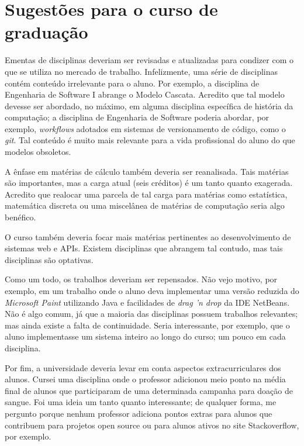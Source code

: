 

\section{Sugestões para o curso de graduação}

Ementas de disciplinas deveriam ser revisadas e atualizadas para
condizer com o que se utiliza no mercado de trabalho.
Infelizmente, uma série de disciplinas contém conteúdo
irrelevante para o aluno. Por exemplo, a disciplina de Engenharia
de Software I abrange o Modelo Cascata. Acredito que tal modelo
devesse ser abordado, no máximo, em alguma disciplina específica
de história da computação; a disciplina de Engenharia de Software
poderia abordar, por exemplo, \emph{workflows} adotados em
sistemas de versionamento de código, como o \emph{git}. Tal
conteúdo é muito mais relevante para a vida profissional do aluno
do que modelos obsoletos.

A ênfase em matérias de cálculo também deveria ser reanalisada.
Tais matérias são importantes, mas a carga atual (seis créditos)
é um tanto quanto exagerada. Acredito que realocar uma parcela de
tal carga para matérias como estatística, matemática discreta ou 
uma miscelânea de matérias de computação seria algo benéfico.

O curso também deveria focar mais matérias pertinentes ao
desenvolvimento de sistemas web e APIs. Existem disciplinas que
abrangem tal contudo, mas tais disciplinas são optativas.

Como um todo, os trabalhos deveriam ser repensados. Não vejo
motivo, por exemplo, em um trabalho onde o aluno deva implementar
uma versão reduzida do \emph{Microsoft Paint} utilizando Java e
facilidades de \emph{drag 'n drop} da IDE NetBeans. Não é algo
comum, já que a maioria das disciplinas possuem trabalhos relevantes; mas ainda existe a falta de continuidade. Seria interessante,
por exemplo, que o aluno implementasse um sistema inteiro ao
longo do curso; um pouco em cada disciplina.

Por fim, a universidade deveria levar em conta aspectos
extracurriculares dos alunos. Cursei uma disciplina onde o
professor adicionou meio ponto na média final de alunos que
participaram de uma determinada campanha para doação de sangue.
Foi uma ideia um tanto quanto interessante; de qualquer forma, me
pergunto porque nenhum professor adiciona pontos extras para
alunos que contribuem para projetos open source ou para alunos
ativos no site Stackoverflow\cite{Stack}, por exemplo.


